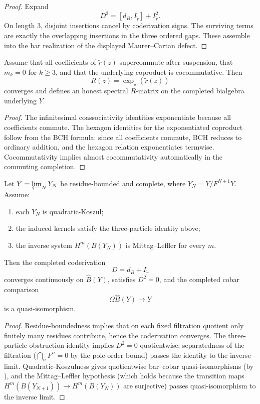 \begin{proof}
Expand
\[
D^2=[d_B,I_{\widetilde r}] + I_{\widetilde r}^2.
\]
On length $3$, disjoint insertions cancel by coderivation signs.
The surviving terms are exactly the overlapping insertions in the three
ordered gaps. These assemble into the bar realization of the displayed
Maurer--Cartan defect.
\end{proof}

\begin{theorem}
\label{thm:abelian-strictification}
Assume that all coefficients of $\widetilde r(z)$ supercommute after
suspension, that $m_k=0$ for $k\ge 3$, and that the underlying
coproduct is cocommutative. Then
\[
R(z)=\exp_\star(\widetilde r(z))
\]
converges and defines an honest spectral $R$-matrix on the completed
bialgebra underlying $Y$.
\end{theorem}

\begin{proof}
The infinitesimal coassociativity identities exponentiate because all
coefficients commute. The hexagon identities for the exponentiated
coproduct follow from the BCH formula: since all coefficients
commute, BCH reduces to ordinary addition, and the hexagon relation
exponentiates termwise. Cocommutativity implies almost
cocommutativity automatically in the commuting completion.
\end{proof}

\begin{theorem}
\label{thm:residue-bounded-completion}
Let $Y=\varprojlim_N Y_N$ be residue-bounded and complete, where
$Y_N=Y/F^{N+1}Y$. Assume:
\begin{enumerate}
\item each $Y_N$ is quadratic-Koszul;
\item the induced kernels satisfy the three-particle identity above;
\item the inverse system $H^m(B(Y_N))$ is Mittag--Leffler for every $m$.
\end{enumerate}
Then the completed coderivation
\[
D=d_B+I_{\widetilde r}
\]
converges continuously on $\widehat B(Y)$, satisfies $D^2=0$, and the
completed cobar comparison
\[
\Omega\widehat B(Y)\longrightarrow Y
\]
is a quasi-isomorphism.
\end{theorem}

\begin{proof}
Residue-boundedness implies that on each fixed filtration quotient only
finitely many residues contribute, hence the coderivation converges.
The three-particle obstruction identity implies $D^2=0$ quotientwise;
separatedness of the filtration ($\bigcap_n F^n = 0$ by the
pole-order bound) passes the identity to the inverse limit.
Quadratic-Koszulness gives quotientwise bar--cobar
quasi-isomorphisms (by \cite[Proposition~2.2.1]{LV12}), and the
Mittag--Leffler hypothesis (which holds because the transition maps
$H^m(B(Y_{N+1}))\to H^m(B(Y_N))$ are surjective) passes
quasi-isomorphism to the inverse limit.
\end{proof}

